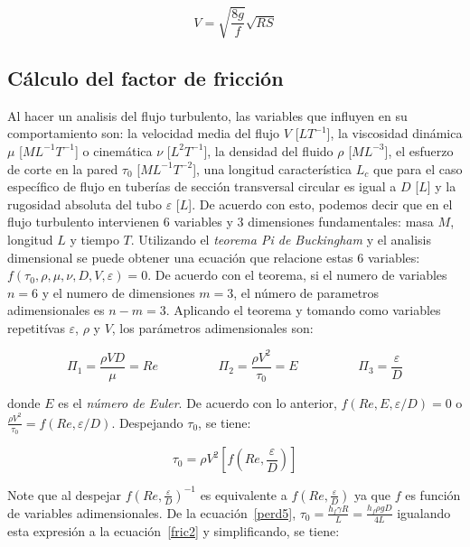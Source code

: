 \documentclass[11pt, oneside]{article}
\begin{document}
\begin{equation}
V = \sqrt{\frac{8g}{f}}\sqrt{RS}
\label{perd9}
\end{equation}

\subsection{C\'alculo del factor de fricci\'on} %
Al hacer un analisis del flujo turbulento, las variables que influyen en su comportamiento son: la velocidad media del flujo $V$ [$L T^{-1}$], la viscosidad din\'amica  $\mu$ [$ML^{-1} T^{-1}$] o cinem\'atica $\nu$ [$L^{2} T^{-1}$], la densidad del fluido $\rho$ [$M L^{-3}$], el esfuerzo de corte en la pared $\tau_0$ [$ML^{-1} T^{-2}$], una longitud caracter\'istica $L_c$ que para el caso espec\'ifico de flujo en tuber\'ias de secci\'on transversal circular es igual a $D$ [$L$] y la rugosidad absoluta del tubo $\varepsilon$ [$L$]. De acuerdo con esto, podemos decir que en el flujo turbulento intervienen 6 variables y 3 dimensiones fundamentales: masa $M$, longitud $L$ y tiempo $T$. Utilizando el \emph{teorema Pi de Buckingham} y el analisis dimensional se puede obtener una ecuaci\'on que relacione estas 6 variables: $f(\tau_0, \rho, \mu, \nu, D, V, \varepsilon)=0$. De acuerdo con el teorema, si el numero de variables $n=6$ y el numero de dimensiones $m=3$, el n\'umero de parametros adimensionales es $n-m=3$. Aplicando el teorema y tomando como variables repetit\'ivas $\varepsilon$, $\rho$ y $V$,  los par\'ametros adimensionales son: 

\begin{equation}
\Pi_1 = \frac{\rho V D}{\mu} = Re \hspace{2cm}  \Pi_2 = \frac{\rho V^2}{\tau_0} = E \hspace{2cm} \Pi_3 = \frac{\varepsilon}{D} 
\label{fric1}
\end{equation}

donde $E$ es el \emph{n\'umero de Euler}. De acuerdo con lo anterior, $f(Re, E, \varepsilon/D)=0$ o  $\frac{\rho V^2}{\tau_0} = f(Re,\varepsilon/D)$. Despejando $\tau_0$, se tiene:

\begin{equation}
\tau_0 = \rho V^2 \left[ f \left(Re , \frac{\varepsilon}{D} \right) \right]
\label{fric2}
\end{equation}

Note que al despejar $ f \left(Re , \frac{\varepsilon}{D}\right)^{-1}$ es equivalente a $f \left(Re , \frac{\varepsilon}{D}\right)$ ya que $f$ es funci\'on de variables adimensionales. De la ecuaci\'on~\ref{perd5},  $\tau_0 = \frac{h_f \gamma R}{L} = \frac{h_f \rho g D}{4L}$ igualando esta expresi\'on a la ecuaci\'on~\ref{fric2} y simplificando, se tiene:
\end{document}
